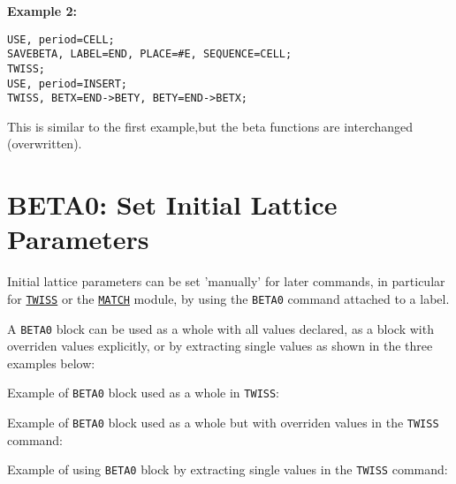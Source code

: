 \textbf{Example 2:} 
\begin{verbatim}
USE, period=CELL;
SAVEBETA, LABEL=END, PLACE=#E, SEQUENCE=CELL;
TWISS;
USE, period=INSERT;
TWISS, BETX=END->BETY, BETY=END->BETX;
\end{verbatim}
This is similar to the first example,but the beta functions are interchanged (overwritten).  

\section{BETA0: Set Initial Lattice Parameters}
\label{sec:beta0}
Initial lattice parameters can be set 'manually' for later commands, in
particular for \hyperref[chap:twiss]{\texttt{TWISS}} or the 
\hyperref[chap:match]{\texttt{MATCH}} module, by
using the \texttt{BETA0} command attached to a label.  


A \texttt{BETA0} block can be used as a whole with all values declared,
as a block with overriden values explicitly, or by extracting single
values as shown in the three examples below:

Example of \texttt{BETA0} block used as a whole in \texttt{TWISS}: 

Example of \texttt{BETA0} block used as a whole but with overriden
values in the \texttt{TWISS} command:

Example of using \texttt{BETA0} block by extracting single values in the
\texttt{TWISS} command:


